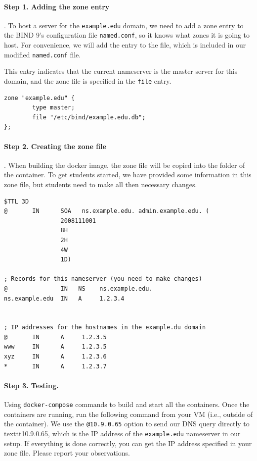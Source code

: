 \paragraph{Step 1. Adding the zone entry}. To host
a server for the \texttt{example.edu} domain, we need to
add a zone entry to the BIND 9's configuration file \texttt{named.conf}, 
so it knows what zones it is going to host. For convenience,
we will add the entry to the  file, which
is included in our modified \texttt{named.conf} file.


This entry indicates that the current nameserver 
is the master server for this domain, and the zone file is 
specified in the \texttt{file} entry.  


\begin{lstlisting}
zone "example.edu" {
        type master;
        file "/etc/bind/example.edu.db";
};
\end{lstlisting}


\paragraph{Step 2. Creating the zone file}. 
When building the docker image, the zone file 
 will be copied into
the  folder of the container. 
To get students started, we have provided some 
information in this zone file, but students need to make 
all then necessary changes.

\begin{lstlisting}
$TTL 3D
@       IN      SOA   ns.example.edu. admin.example.edu. (
                2008111001
                8H
                2H
                4W
                1D)

; Records for this nameserver (you need to make changes)
@               IN   NS    ns.example.edu.
ns.example.edu  IN   A     1.2.3.4


; IP addresses for the hostnames in the example.du domain
@       IN      A     1.2.3.5
www     IN      A     1.2.3.5
xyz     IN      A     1.2.3.6
*       IN      A     1.2.3.7
\end{lstlisting}
 


\paragraph{Step 3. Testing.} Using \texttt{docker-compose} commands
to build and start all the containers. 
Once the containers are running,
run the following command from your VM (i.e., outside of the 
container). We use the \texttt{@10.9.0.65} option to send our DNS query
directly to texttt{10.9.0.65}, which is the IP
address of the \texttt{example.edu} nameserver in our setup. 
If everything is done correctly, you can get the IP address specified
in your zone file. Please report your observations.


